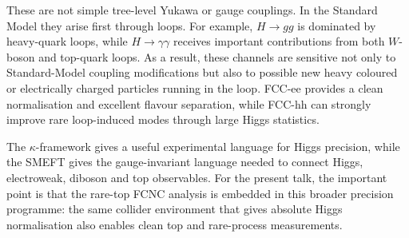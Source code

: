 \documentclass[11pt,a4paper]{report}
\begin{document}
These are not simple tree-level Yukawa or gauge couplings.  In the Standard
Model they arise first through loops.  For example, \(H\to gg\) is dominated
by heavy-quark loops, while \(H\to\gamma\gamma\) receives important
contributions from both \(W\)-boson and top-quark loops.  As a result, these
channels are sensitive not only to Standard-Model coupling modifications but
also to possible new heavy coloured or electrically charged particles running
in the loop.  FCC-ee provides a clean normalisation and excellent flavour
separation, while FCC-hh can strongly improve rare loop-induced modes through
large Higgs statistics.

\begin{keymessagebox}
The \(\kappa\)-framework gives a useful experimental language for Higgs
precision, while the SMEFT gives the gauge-invariant language needed to connect
Higgs, electroweak, diboson and top observables.  For the present talk, the
important point is that the rare-top FCNC analysis is embedded in this broader
precision programme: the same collider environment that gives absolute Higgs
normalisation also enables clean top and rare-process measurements.
\end{keymessagebox}
\end{document}
